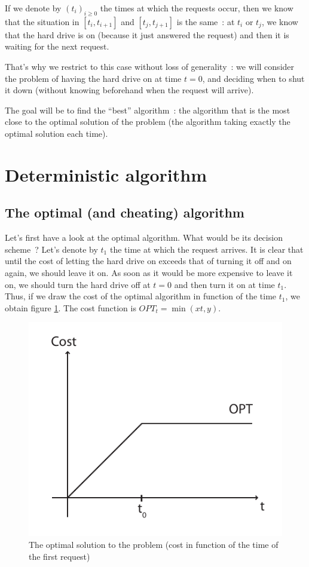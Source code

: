 \documentclass[a4paper,11pt]{article}
\begin{document}
If we denote by $(t_i)_{i \geq 0}$ the times at which the requests occur, then we know that the situation in $[t_i, t_{i+1}]$ and $[t_j, t_{j+1}]$ is the same~: at $t_i$ or $t_j$, we know that the hard drive is on (because it just answered the request) and then it is waiting for the next request.

That's why we restrict to this case without loss of generality~: we will consider the problem of having the hard drive on at time $t = 0$, and deciding when to shut it down (without knowing beforehand when the request will arrive).

The goal will be to find the ``best'' algorithm~: the algorithm that is the most close to the optimal solution of the problem (the algorithm taking exactly the optimal solution each time).


\section{Deterministic algorithm}

\subsection{The optimal (and cheating) algorithm}

Let's first have a look at the optimal algorithm. What would be its decision scheme~? Let's denote by $t_1$ the time at which the request arrives. It is clear that until the cost of letting the hard drive on exceeds that of turning it off and on again, we should leave it on. As soon as it would be more expensive to leave it on, we should turn the hard drive off at $t = 0$ and then turn it on at time $t_1$. Thus, if we draw the cost of the optimal algorithm in function of the time $t_1$, we obtain figure \ref{fig1}. The cost function is $OPT_t = \min (x t, y)$.
\begin{figure}
	\center \includegraphics{Figures/Fig1}
	\caption{The optimal solution to the problem (cost in function of the time of the first request)} \label{fig1}
\end{figure}
\end{document}
